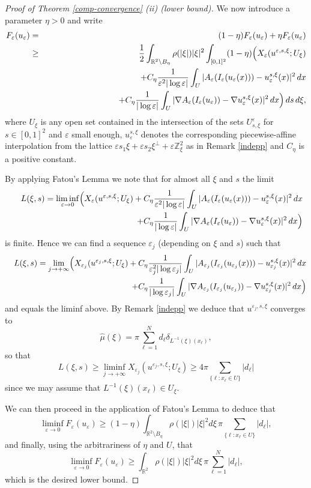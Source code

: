 \documentclass[11pt]{article}
\def\e{\varepsilon}
\begin{document}
\begin{proof}[Proof of Theorem {\rm\ref{comp-convergence}} {\rm (ii)} (lower bound)]
We now introduce a parameter $\eta>0$ and write
\begin{eqnarray*}
F_\e(u_\e)& =&
(1-\eta)F_\e(u_\e) +\eta F_\e(u_\e)\\
&\ge& \frac{1}{2}\int_{\mathbb R^2\setminus B_\eta}\rho(|\xi|)|\xi|^2 
\int_{[0,1]^2}(1-\eta)\Bigl(X_\e (u^{\e,s,\xi};U_\xi) \\
&&\hskip3cm +C_\eta\frac{1}{\e^2|\log\e|}\int_U| A_\e(I_\e(u_\e (x))) - u^{s,\xi}_\e(x)|^2\, dx\nonumber\\
 &&\hskip3cm +C_\eta
 \frac{1}{|\log\e|}\int_U| \nabla A_\e(I_\e(u_\e)) - \nabla u^{s,\xi}_\e(x)|^2\, dx\Big)\, ds\,d\xi,
\end{eqnarray*}
where $U_\xi$ is any open set contained in the intersection of the sets $U^\e_{s,\xi}$ for $s\in[0,1]^2$ and $\e$ small enough, $u^{s,\xi}_\e$ denotes the corresponding piecewise-affine interpolation from the lattice $\e s_1\xi+\e s_2\xi^\perp+\e \mathbb Z^2_\xi$ as in Remark \ref{indepp} and $C_\eta$ is a positive constant.

By applying Fatou's Lemma we note that for almost all $\xi$ and $s$ the limit 
\begin{eqnarray*}
&&L(\xi,s)=\liminf_{\e\to 0} \Bigl(X_\e (u^{\e,s,\xi};U_\xi) +C_\eta\frac{1}{\e^2|\log\e|}\int_U| A_\e(I_\e(u_\e (x))) - u^{s,\xi}_\e(x)|^2\, dx\nonumber\\
 &&\hskip5cm +C_\eta
 \frac{1}{|\log\e|}\int_U| \nabla A_\e(I_\e(u_\e)) - \nabla u^{s,\xi}_\e(x)|^2\, dx\Big)
\end{eqnarray*}
is finite. Hence we can find a sequence $\e_j$ (depending on $\xi$ and $s$) such that 
\begin{eqnarray*}
&&L(\xi,s)=\lim_{j\to+\infty} \Bigl(X_{\e_j} (u^{\e_j,s,\xi};U_\xi)+C_\eta\frac{1}{\e_j^2|\log\e_j|}\int_U| A_{\e_j}(I_{\e_j}(u_{\e_j} (x))) - u^{s,\xi}_{\e_j}(x)|^2\, dx\\&&\hskip5cm +C_\eta
 \frac{1}{|\log{\e_j}|}\int_U| \nabla A_{\e_j}(I_{\e_j}(u_{\e_j})) - \nabla u^{s,\xi}_{\e_j}(x)|^2\, dx\Big)
\end{eqnarray*}
and equals the liminf above.  
By Remark \ref{indepp} we deduce that $u^{\e_j,s,\xi}$ converges to 
$$\hat\mu(\xi)=\pi\sum_{\ell=1}^Nd_\ell\delta_{L^{-1}(\xi)(x_\ell)},$$ 
so that
$$L(\xi,s)\ge \liminf_{j\to+\infty}X_{\e_j} (u^{\e_j,s,\xi};U_\xi)\ge 4\pi\sum_{\{\ell: x_\ell\in U\}} |d_\ell|$$ 
since we may assume that $L^{-1}(\xi)(x_\ell)\in U_\xi$. 

We can then proceed in the application of Fatou's Lemma to deduce that
$$\liminf_{\e\to0}F_\e(u_\e)\ge (1-\eta)\int_{\mathbb R^2\setminus B_\eta}\rho(|\xi|)|\xi|^2d\xi\,  \pi\sum_{\{\ell: x_\ell\in U\}}|d_\ell|,
$$
and finally, using the arbitrariness of $\eta$ and $U$, that
$$\liminf_{\e\to0}F_\e(u_\e)\ge \int_{\mathbb R^2}\rho(|\xi|)|\xi|^2d\xi\,  \pi\sum_{\ell=1}^N|d_\ell|,$$
which is the desired lower bound.


\end{proof}
\end{document}
